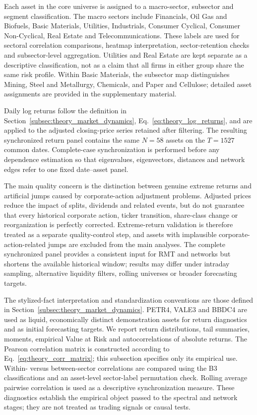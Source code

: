 Each asset in the core universe is assigned to a macro-sector, subsector and segment classification. The macro sectors include Financials, Oil Gas and Biofuels, Basic Materials, Utilities, Industrials, Consumer Cyclical, Consumer Non-Cyclical, Real Estate and Telecommunications. These labels are used for sectoral correlation comparisons, heatmap interpretation, sector-retention checks and subsector-level aggregation. Utilities and Real Estate are kept separate as a descriptive classification, not as a claim that all firms in either group share the same risk profile. Within Basic Materials, the subsector map distinguishes Mining, Steel and Metallurgy, Chemicals, and Paper and Cellulose; detailed asset assignments are provided in the supplementary material.

\label{subsec:notation}

Daily log returns follow the definition in Section~\ref{subsec:theory_market_dynamics}, Eq.~\eqref{eq:theory_log_returns}, and are applied to the adjusted closing-price series retained after filtering. The resulting synchronized return panel contains the same $N=58$ assets on the $T=1527$ common dates. Complete-case synchronization is performed before any dependence estimation so that eigenvalues, eigenvectors, distances and network edges refer to one fixed date--asset panel.

The main quality concern is the distinction between genuine extreme returns and artificial jumps caused by corporate-action adjustment problems. Adjusted prices reduce the impact of splits, dividends and related events, but do not guarantee that every historical corporate action, ticker transition, share-class change or reorganization is perfectly corrected. Extreme-return validation is therefore treated as a separate quality-control step, and assets with implausible corporate-action-related jumps are excluded from the main analyses. The complete synchronized panel provides a consistent input for RMT and networks but shortens the available historical window; results may differ under intraday sampling, alternative liquidity filters, rolling universes or broader forecasting targets.

\label{subsec:stylized_method}

The stylized-fact interpretation and standardization conventions are those defined in Section~\ref{subsec:theory_market_dynamics}. PETR4, VALE3 and BBDC4 are used as liquid, economically distinct demonstration assets for return diagnostics and as initial forecasting targets. We report return distributions, tail summaries, moments, empirical Value at Risk and autocorrelations of absolute returns. The Pearson correlation matrix is constructed according to Eq.~\eqref{eq:theory_corr_matrix}; this subsection specifies only its empirical use. Within- versus between-sector correlations are compared using the B3 classifications and an asset-level sector-label permutation check. Rolling average pairwise correlation is used as a descriptive synchronization measure. These diagnostics establish the empirical object passed to the spectral and network stages; they are not treated as trading signals or causal tests.

